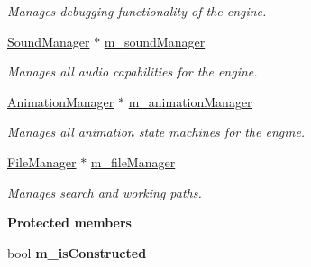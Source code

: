 \begin{Indent}
\begin{DoxyCompactItemize}
\begin{DoxyCompactList}\small\item\em Manages debugging functionality of the engine. \end{DoxyCompactList}\item 
\mbox{\label{classrev_1_1_core_engine_abf7ccca4eff794b7cf0f474c81bef09b}} 
\mbox{\hyperlink{classrev_1_1_sound_manager}{Sound\+Manager}} $\ast$ \mbox{\hyperlink{classrev_1_1_core_engine_abf7ccca4eff794b7cf0f474c81bef09b}{m\+\_\+sound\+Manager}}
\begin{DoxyCompactList}\small\item\em Manages all audio capabilities for the engine. \end{DoxyCompactList}\item 
\mbox{\label{classrev_1_1_core_engine_a9f385ba1b4d0a89da58d5716b41d266e}} 
\mbox{\hyperlink{classrev_1_1_animation_manager}{Animation\+Manager}} $\ast$ \mbox{\hyperlink{classrev_1_1_core_engine_a9f385ba1b4d0a89da58d5716b41d266e}{m\+\_\+animation\+Manager}}
\begin{DoxyCompactList}\small\item\em Manages all animation state machines for the engine. \end{DoxyCompactList}\item 
\mbox{\label{classrev_1_1_core_engine_a4695697be955889ae61bac923f489dac}} 
\mbox{\hyperlink{classrev_1_1_file_manager}{File\+Manager}} $\ast$ \mbox{\hyperlink{classrev_1_1_core_engine_a4695697be955889ae61bac923f489dac}{m\+\_\+file\+Manager}}
\begin{DoxyCompactList}\small\item\em Manages search and working paths. \end{DoxyCompactList}\end{DoxyCompactItemize}
\end{Indent}
\begin{Indent}\textbf{ Protected members}\par
\begin{DoxyCompactItemize}
\item 
\mbox{\label{classrev_1_1_core_engine_ad6bce6550594298ac41384d34916396e}} 
bool {\bfseries m\+\_\+is\+Constructed}
\end{DoxyCompactItemize}
\end{Indent}
